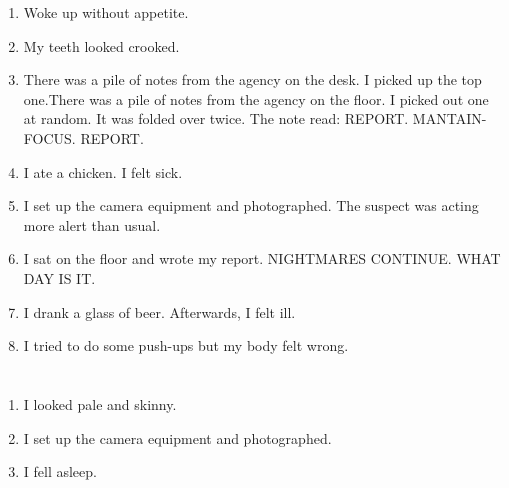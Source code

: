 \documentclass{article}
\begin{document}
    \begin{enumerate}
    
    \item Woke up without appetite.\\
    
    \item My teeth looked crooked.\\
    
    \item There was a pile of notes from the agency on the desk. I picked up the top one.There was a pile of notes from the agency on the floor. I picked out one at random. It was folded over twice. The note read: REPORT. MANTAIN-FOCUS. REPORT.\\
    
    \item I ate a chicken. I felt sick.\\
    
    \item I set up the camera equipment and photographed. The suspect was acting more alert than usual.\\
    
    \item I sat on the floor and wrote my report. NIGHTMARES CONTINUE. WHAT DAY IS IT.\\
    
    \item I drank a glass of beer. Afterwards, I felt ill.\\
    
    \item I tried to do some push-ups but my body felt wrong.\\
    
    \end{enumerate}
     
    \newpage
    
    \section{}
    
    \begin{enumerate}
    
    \item I looked pale and skinny.\\
    
    \item I set up the camera equipment and photographed.\\
    
    \item I fell asleep.\\
    
    \end{enumerate}
     
\end{document}
